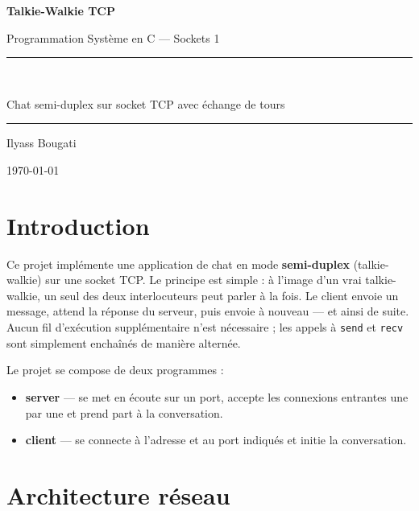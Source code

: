 \documentclass[12pt,a4paper]{article}
\begin{document}
\begin{titlepage}
    \centering
    \vspace*{2cm}
    {\Huge\bfseries Talkie-Walkie TCP\par}
    \vspace{0.5cm}
    {\Large Programmation Système en C --- Sockets 1\par}
    \vspace{2cm}
    \rule{\linewidth}{0.4pt}\\[0.4cm]
    {\large Chat semi-duplex sur socket TCP avec échange de tours\par}
    \rule{\linewidth}{0.4pt}
    \vfill
    {\large Ilyass Bougati\par}
    \vspace{0.3cm}
    {\large \today\par}
\end{titlepage}

\tableofcontents
\newpage

\section{Introduction}

Ce projet implémente une application de chat en mode \textbf{semi-duplex}
(talkie-walkie) sur une socket TCP. Le principe est simple : à l'image d'un
vrai talkie-walkie, un seul des deux interlocuteurs peut parler à la fois. Le
client envoie un message, attend la réponse du serveur, puis envoie à nouveau
--- et ainsi de suite. Aucun fil d'exécution supplémentaire n'est nécessaire ;
les appels à \texttt{send} et \texttt{recv} sont simplement enchaînés de
manière alternée.

Le projet se compose de deux programmes :

\begin{itemize}
    \item \textbf{server} --- se met en écoute sur un port, accepte les
          connexions entrantes une par une et prend part à la conversation.
    \item \textbf{client} --- se connecte à l'adresse et au port indiqués
          et initie la conversation.
\end{itemize}

\section{Architecture réseau}
\end{document}
